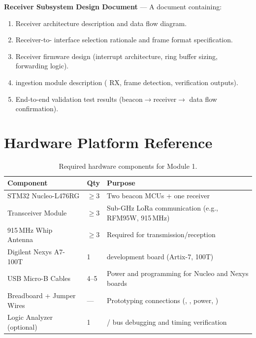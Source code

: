 \documentclass[11pt,letterpaper]{article}
\begin{document}
	\begin{tcolorbox}[deliverable={Week 4 Deliverable}]
		\textbf{Receiver Subsystem Design Document} --- A document containing:
		\begin{enumerate}
			\item Receiver architecture description and data flow diagram.
			\item Receiver-to-\FPGA{} interface selection rationale and frame format specification.
			\item Receiver firmware design (interrupt architecture, ring buffer sizing, forwarding logic).
			\item \FPGA{} ingestion module description (\UART{} RX, frame detection, verification outputs).
			\item End-to-end validation test results (beacon$\rightarrow$receiver$\rightarrow$\FPGA{} data flow confirmation).
		\end{enumerate}
	\end{tcolorbox}
	
	\newpage
	\section{Hardware Platform Reference}
	\label{sec:hardware}
	
	\begin{table}[ht!]
		\centering
		\caption{Required hardware components for Module 1.}
		\label{tab:hardware}
		\renewcommand{\arraystretch}{1.3}
		\begin{tabularx}{\textwidth}{l l X}
			\toprule
			\textbf{Component} & \textbf{Qty} & \textbf{Purpose} \\
			\midrule
			STM32 Nucleo-L476RG & $\geq 3$ & Two beacon MCUs + one receiver \MCU{} \\
			\RF{} Transceiver Module & $\geq 3$ & Sub-GHz LoRa communication (e.g., RFM95W, 915\,MHz) \\
			915\,MHz Whip Antenna & $\geq 3$ & Required for \RF{} transmission/reception \\
			Digilent Nexys A7-100T & 1 & \FPGA{} development board (Artix-7, 100T) \\
			USB Micro-B Cables & 4--5 & Power and programming for Nucleo and Nexys boards \\
			Breadboard + Jumper Wires & --- & Prototyping connections (\SPI{}, \GPIO{}, power, \UART{}) \\
			Logic Analyzer (optional) & 1 & \SPI{}/\UART{} bus debugging and timing verification \\
			\bottomrule
		\end{tabularx}
	\end{table}
	
\end{document}

